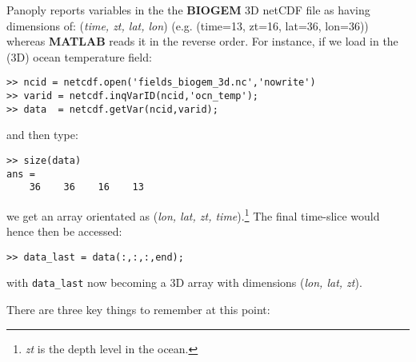 \documentclass[11pt,fleqn]{book} %
\begin{document}
Panoply reports variables in the the \textbf{BIOGEM} 3D netCDF file as having dimensions of: (\textit{time, zt, lat, lon}) (e.g. (time=13, zt=16, lat=36, lon=36)) whereas \textbf{MATLAB} reads it in the reverse order. For instance, if we load in the (3D) ocean temperature field:
\begin{verbatim}
>> ncid = netcdf.open('fields_biogem_3d.nc','nowrite')
>> varid = netcdf.inqVarID(ncid,'ocn_temp');
>> data  = netcdf.getVar(ncid,varid);
\end{verbatim}
and then type:
\begin{verbatim}
>> size(data)
ans =
    36    36    16    13
\end{verbatim}
we get an array orientated as (\textit{lon, lat, zt, time}).\footnote{\textit{zt} is the depth level in the ocean.} The final time-slice would hence then be accessed:
\begin{verbatim}
>> data_last = data(:,:,:,end);
\end{verbatim}
with \texttt{data\_last} now becoming a 3D array with dimensions (\textit{lon, lat, zt}).

\vspace{2mm}
There are three key things to remember at this point:
\end{document}
